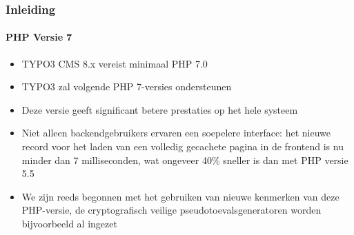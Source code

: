 \begin{frame}[fragile]
	\frametitle{Inleiding}
	\framesubtitle{PHP Versie 7}

	\begin{itemize}

		\item TYPO3 CMS 8.x vereist minimaal PHP 7.0
		\item TYPO3 zal volgende PHP 7-versies ondersteunen
		\item Deze versie geeft significant betere prestaties op het hele systeem

		\item Niet alleen backendgebruikers ervaren een soepelere interface: het 
			nieuwe record voor het laden van een volledig gecachete pagina in de frontend is nu minder
			dan 7 milliseconden, wat ongeveer 40\% sneller is dan met PHP versie 5.5

		\item We zijn reeds begonnen met het gebruiken van nieuwe kenmerken van deze PHP-versie, 
			de cryptografisch veilige pseudotoevalsgeneratoren worden bijvoorbeeld al ingezet

	\end{itemize}

\end{frame}

